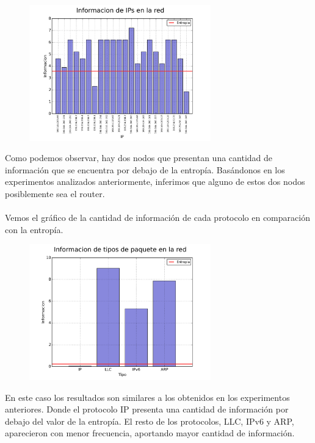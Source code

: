 \FloatBarrier

\begin{figure}[ht!]
  \centering
   \includegraphics[width=0.7\textwidth]{graficos/shopping_information_bars_arp.png}
  \caption{}
  \label{fig:shopping_information_bars_arp}
\end{figure}

\FloatBarrier

Como podemos observar, hay dos nodos que presentan una cantidad de información que se encuentra por debajo de la entropía. Basándonos en los experimentos analizados anteriormente, inferimos que alguno de estos dos nodos posiblemente sea el router.
\\\\
Vemos el gráfico de la cantidad de información de cada protocolo en comparación con la entropía.

\FloatBarrier

\begin{figure}[ht!]
  \centering
   \includegraphics[width=0.7\textwidth]{graficos/shopping_information_bars_type.png}
  \caption{}
  \label{fig:shopping_information_bars_type}
\end{figure}

\FloatBarrier

En este caso los resultados son similares a los obtenidos en los experimentos anteriores. Donde el protocolo IP presenta una cantidad de información por debajo del valor de la entropía. El resto de los protocolos, LLC, IPv6 y ARP, aparecieron con menor frecuencia, aportando mayor cantidad de información.